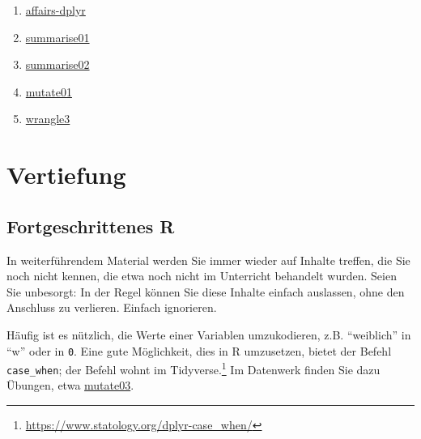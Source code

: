 \documentclass[
  letterpaper,
  twoside,
  open=any]{scrbook}
\theoremstyle{definition}
\theoremstyle{definition}
\theoremstyle{definition}
\theoremstyle{remark}
\begin{document}
\begin{enumerate}
\item
  \href{https://sebastiansauer.github.io/Datenwerk/posts/affairs-dplyr/affairs-dplyr.html}{affairs-dplyr}
\item
  \href{https://sebastiansauer.github.io/Datenwerk/posts/summarise01/summarise01.html}{summarise01}
\item
  \href{https://sebastiansauer.github.io/Datenwerk/posts/summarise02/summarise02.html}{summarise02}
\item
  \href{https://sebastiansauer.github.io/Datenwerk/posts/mutate01/mutate01.html}{mutate01}
\item
  \href{https://sebastiansauer.github.io/Datenwerk/posts/wrangle3/wrangle3}{wrangle3}
\end{enumerate}

\section{Vertiefung}\label{vertiefung-2}

\subsection{Fortgeschrittenes R}\label{fortgeschrittenes-r}

\begin{tcolorbox}[enhanced jigsaw, colframe=quarto-callout-note-color-frame, arc=.35mm, leftrule=.75mm, bottomtitle=1mm, titlerule=0mm, colbacktitle=quarto-callout-note-color!10!white, breakable, bottomrule=.15mm, colback=white, left=2mm, rightrule=.15mm, opacityback=0, toptitle=1mm, toprule=.15mm, opacitybacktitle=0.6, title=\textcolor{quarto-callout-note-color}{\faInfo}\hspace{0.5em}{Hinweis}, coltitle=black]

In weiterführendem Material werden Sie immer wieder auf Inhalte treffen,
die Sie noch nicht kennen, die etwa noch nicht im Unterricht behandelt
wurden. Seien Sie unbesorgt: In der Regel können Sie diese Inhalte
einfach auslassen, ohne den Anschluss zu verlieren. Einfach ignorieren.

\end{tcolorbox}

Häufig ist es nützlich, die Werte einer Variablen umzukodieren, z.B.
\enquote{weiblich} in \enquote{w} oder in \texttt{0}. Eine gute
Möglichkeit, dies in R umzusetzen, bietet der Befehl
\texttt{case\_when}; der Befehl wohnt im Tidyverse.\footnote{\url{https://www.statology.org/dplyr-case_when/}}
Im Datenwerk finden Sie dazu Übungen, etwa
\href{https://sebastiansauer.github.io/Datenwerk/posts/mutate03/mutate03.html}{mutate03}.
\end{document}
